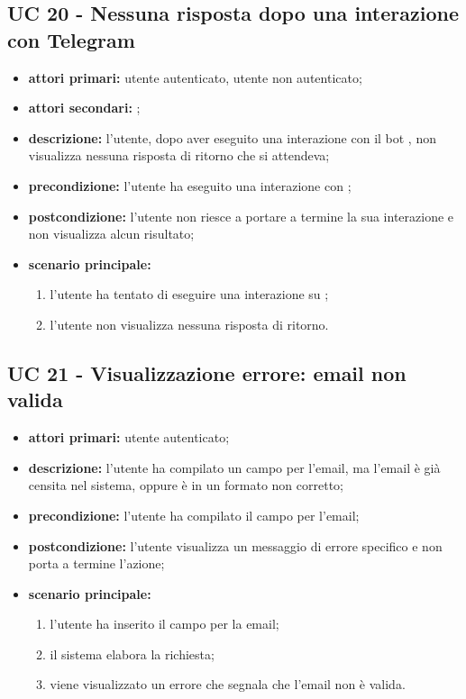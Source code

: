 
		\subsection{UC 20 - Nessuna risposta dopo una interazione con Telegram}
		\begin{itemize}
			\item \textbf{attori primari:} utente autenticato, utente non autenticato;
			\item \textbf{attori secondari:} ;
			\item \textbf{descrizione:} l'utente, dopo aver eseguito una interazione con il bot , non visualizza nessuna risposta di ritorno che si attendeva;
			\item \textbf{precondizione:} l'utente ha eseguito una interazione con ;
			\item \textbf{postcondizione:} l'utente non riesce a portare a termine la sua interazione e non visualizza alcun risultato;
			\item \textbf{scenario principale:}
			\begin{enumerate}
				\item l'utente ha tentato di eseguire una interazione su ;
				\item l'utente non visualizza nessuna risposta di ritorno.
			\end{enumerate}
		\end{itemize}



		\subsection{UC 21 - Visualizzazione errore: email non valida}
		\begin{itemize}
			\item \textbf{attori primari:} utente autenticato;
			\item \textbf{descrizione:} l'utente ha compilato un campo per l'email, ma l'email è già censita nel sistema, oppure è in un formato non corretto;
			\item \textbf{precondizione:} l'utente ha compilato il campo per l'email;
			\item \textbf{postcondizione:} l'utente visualizza un messaggio di errore specifico e non porta a termine l'azione;
			\item \textbf{scenario principale:}
			\begin{enumerate}
				\item l'utente ha inserito il campo per la email;
				\item il sistema elabora la richiesta;
				\item viene visualizzato un errore che segnala che l'email non è valida.
			\end{enumerate}
		\end{itemize}

